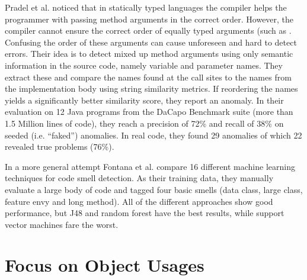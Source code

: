 Pradel et al. \cite{pradel2011detecting} noticed that in statically typed languages the compiler helps the programmer with passing method arguments in the correct order.
However, the compiler cannot ensure the correct order of equally typed arguments (such as .
Confusing the order of these arguments can cause unforeseen and hard to detect errors.
Their idea is to detect mixed up method arguments using only semantic information in the source code, namely variable and parameter names.
They extract these and compare the names found at the call sites to the names from the implementation body using string similarity metrics. 
If reordering the names yields a significantly better similarity score, they report an anomaly.
In their evaluation on 12 Java programs from the DaCapo Benchmark suite \cite{blackburn2006dacapo} (more than 1.5 Million lines of code), they reach a precision of 72\% and recall of 38\% on seeded (i.e. ``faked'') anomalies.
In real code, they found 29 anomalies of which 22 revealed true problems (76\%).

In a more general attempt Fontana et al. \cite{fontana2013code}\cite{fontana2016comparing} compare 16 different machine learning techniques for code smell detection.
As their training data, they manually evaluate a large body of code and tagged four basic smells (data class, large class, feature envy and long method).
All of the different approaches show good performance, but J48 and random forest have the best results, while support vector machines fare the worst.

\section{Focus on Object Usages}



